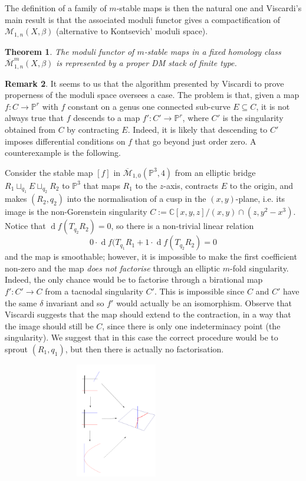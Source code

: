 \documentclass[11pt]{amsart}
\newcommand{\PP}{\mathbb P}
\renewcommand{\to}{\rightarrow}
\theoremstyle{plain}
\newtheorem{thm}{Theorem}[section]
\theoremstyle{definition}
\newtheorem{remark}[thm]{Remark}
\begin{document}
The definition of a family of $m$-stable maps is then the natural one and Viscardi's main result \cite[Thm. 3.6]{VISC} is that the associated moduli functor gives a compactification of $\mathcal M_{1,n}(X,\beta)$ (alternative to Kontsevich' moduli space).
\begin{thm}
The moduli functor of $m$-stable maps in a fixed homology class $\overline{\mathcal{M}}^m_{1,n}(X,\beta)$ is represented by a proper DM stack of finite type.
\end{thm}
\begin{remark}\label{remark:sprouting}
It seems to us that the algorithm presented by Viscardi to prove properness of the moduli space oversees a case. The problem is that, given a map $f\colon C\to\PP^r$ with $f$ constant on a genus one connected sub-curve $E\subseteq C$, it is not always true that $f$ descends to a map $f'\colon C'\to\PP^r$, where $C'$ is the singularity obtained from $C$ by contracting $E$. Indeed, it is likely that descending to $C'$ imposes differential conditions on $f$ that go beyond just order zero. A counterexample is the following.

Consider the stable map $[f]$ in $\overline{\mathcal M}_{1,0}(\PP^3,4)$ from an elliptic bridge $R_1\sqcup_{q_1}E\sqcup_{q_2} R_2$ to $\PP^3$ that maps $R_1$ to the $z$-axis, contracts $E$ to the origin, and makes $(R_2,q_2)$ into the normalisation of a cusp in the $(x,y)$-plane, i.e. its image is the non-Gorenstein singularity $C:=\mathbb C[x,y,z]/(x,y)\cap (z,y^2-x^3)$. 
Notice that $\operatorname{d}\!f(T_{q_2}R_2)=0$, so there is a non-trivial linear relation
\[0\cdot\operatorname{d}\!f(T_{q_1}R_1+1\cdot\operatorname{d}\!f(T_{q_2}R_2)=0\] and the map is smoothable; however, it is impossible to make the first coefficient non-zero and the map \emph{does not factorise} through an elliptic $m$-fold singularity. Indeed, the only chance would be to factorise through a birational map $f'\colon C'\to C$ from a tacnodal singularity $C'$. This is impossible since $C$ and $C'$ have the same $\delta$ invariant and so $f'$ would actually be an isomorphism. 
Observe that Viscardi suggests that the map should extend to the contraction, in a way that the image should still be $C$, since there is only one indeterminacy point (the singularity). We suggest that in this case the correct procedure would be to sprout $(R_1,q_1)$, but then there is actually no factorisation.

\begin{center}
\includegraphics[width=10cm,height=5cm]{cusp_line_transv.png}
\end{center}


\end{remark}
\end{document}

